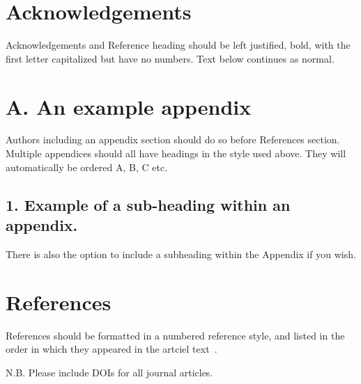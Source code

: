 \documentclass[10pt]{article}
\begin{document}
\section*{Acknowledgements} Acknowledgements and Reference heading should be left justified, bold, with the first letter capitalized but have no numbers. Text below continues as normal.

\section*{A. An example appendix} Authors including an appendix section should do so before References section. Multiple appendices should all have headings in the style used above. They will automatically be ordered A, B, C etc.

\subsection*{1. Example of a sub-heading within an appendix.} There is also the option to include a subheading within the Appendix if you wish.

\section*{References} References should be formatted in a numbered reference style, and listed in the order in which they appeared in the artciel text~\cite{texbook}.

\noindent N.B. Please include DOIs for all journal articles.



\end{document}
